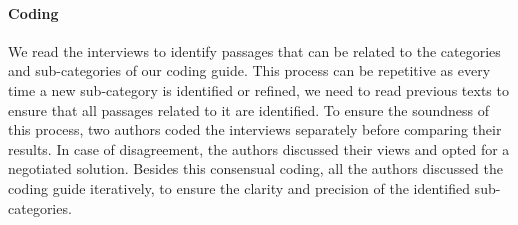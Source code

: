 \paragraph{Coding}
We read the interviews to identify passages that can be related to the categories and sub-categories of our coding guide.
This process can be repetitive as every time a new sub-category is identified or refined, we need to read previous texts to ensure that all passages related to it are identified.
To ensure the soundness of this process, two authors coded the interviews separately before comparing their results.
In case of disagreement, the authors discussed their views and opted for a negotiated solution.
Besides this consensual coding, all the authors discussed the coding guide iteratively, to ensure the clarity and precision of the identified sub-categories.
